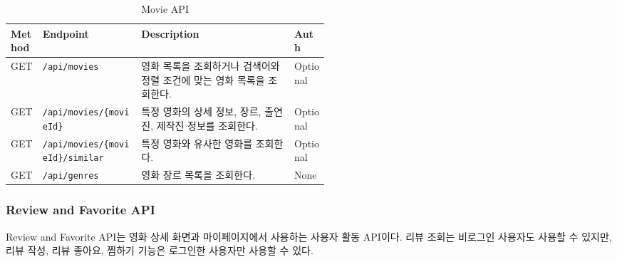 \documentclass[11pt,a4paper]{article}
\renewcommand{\arraystretch}{1.18}
\begin{document}
\begin{table}[H]
\centering
\footnotesize
\setlength{\tabcolsep}{5pt}
\renewcommand{\arraystretch}{1.28}
\begin{tabularx}{\linewidth}{@{}>{\RaggedRight\arraybackslash}p{0.10\linewidth}>{\RaggedRight\arraybackslash}p{0.31\linewidth}>{\RaggedRight\arraybackslash}X>{\RaggedRight\arraybackslash}p{0.11\linewidth}@{}}
\toprule
\textbf{Method} & \textbf{Endpoint} & \textbf{Description} & \textbf{Auth} \\
\midrule
GET & \texttt{/\allowbreak{}api/\allowbreak{}movies} & 영화 목록을 조회하거나 검색어와 정렬 조건에 맞는 영화 목록을 조회한다. & Optional \\
GET & \texttt{/\allowbreak{}api/\allowbreak{}movies/\allowbreak{}\{\allowbreak{}movieId\}\allowbreak{}} & 특정 영화의 상세 정보, 장르, 출연진, 제작진 정보를 조회한다. & Optional \\
GET & \texttt{/\allowbreak{}api/\allowbreak{}movies/\allowbreak{}\{\allowbreak{}movieId\}\allowbreak{}/\allowbreak{}similar} & 특정 영화와 유사한 영화를 조회한다. & Optional \\
GET & \texttt{/\allowbreak{}api/\allowbreak{}genres} & 영화 장르 목록을 조회한다. & None \\
\bottomrule
\end{tabularx}
\caption{Movie API}
\end{table}

\hypertarget{review-and-favorite-api}{%
\subsubsection{Review and Favorite API}\label{review-and-favorite-api}}

Review and Favorite API는 영화 상세 화면과 마이페이지에서 사용하는 사용자 활동 API이다. 리뷰 조회는 비로그인 사용자도 사용할 수 있지만, 리뷰 작성, 리뷰 좋아요, 찜하기 기능은 로그인한 사용자만 사용할 수 있다.
\end{document}
